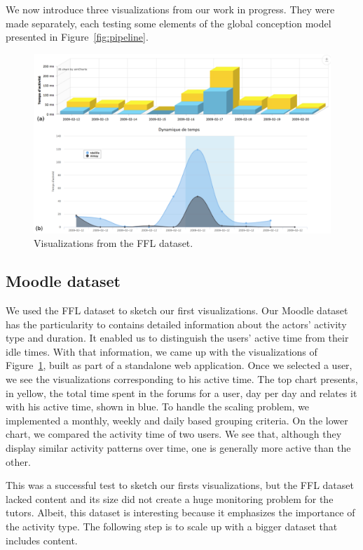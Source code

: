 \documentclass[a4paper,twoside]{article}
\begin{document}
We now introduce three visualizations from our work in progress.  They were made separately, each testing some elements of the global conception model presented in Figure~\ref{fig:pipeline}.


\begin{figure}[t]
 \includegraphics[width=.5\textwidth]{images/dynco_portrait.png}
 \small{
  \caption{\label{fig:dynco}
   Visualizations from the FFL dataset.
  }}
\end{figure}

\subsection{Moodle dataset}
We used the FFL dataset to sketch our first visualizations.  Our Moodle dataset has the particularity to contains detailed information about the actors' activity type and duration.  It enabled us to distinguish the users' active time from their idle times.  With that information, we came up with the visualizations of Figure~\ref{fig:dynco}, built as part of a standalone web application.  Once we selected a user, we see the visualizations corresponding to his active time.   The top chart presents, in yellow, the total time spent in the forums for a user, day per day and relates it with his active time, shown in blue.  To handle the scaling problem, we implemented a monthly, weekly and daily based grouping criteria.  On the lower chart, we compared the activity time of two users.  We see that, although they display similar activity patterns over time, one is generally more active than the other.

This was a successful test to sketch our firsts visualizations, but the FFL dataset lacked content and its size did not create a huge monitoring problem for the tutors.  Albeit, this dataset is interesting because it emphasizes the importance of the activity type.  The following step is to scale up with a bigger dataset that includes content.
\end{document}
